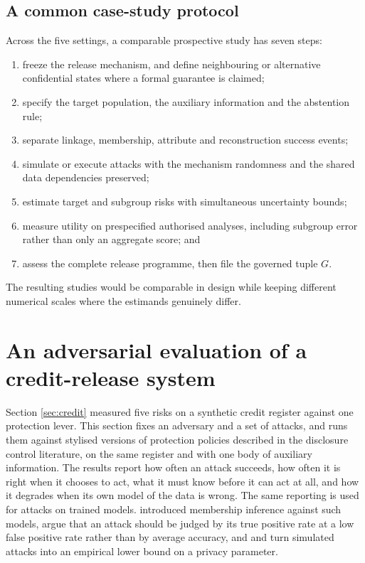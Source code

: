 \documentclass[11pt,a4paper]{article}
\theoremstyle{plain}
\theoremstyle{definition}
\begin{document}
\subsection{A common case-study protocol}

Across the five settings, a comparable prospective study has seven steps:

\begin{enumerate}
\item freeze the release mechanism, and define neighbouring or alternative
confidential states where a formal guarantee is claimed;
\item specify the target population, the auxiliary information and the abstention
rule;
\item separate linkage, membership, attribute and reconstruction success events;
\item simulate or execute attacks with the mechanism randomness and the shared
data dependencies preserved;
\item estimate target and subgroup risks with simultaneous uncertainty bounds;
\item measure utility on prespecified authorised analyses, including subgroup
error rather than only an aggregate score; and
\item assess the complete release programme, then file the governed tuple $G$.
\end{enumerate}

The resulting studies would be comparable in design while keeping different
numerical scales where the estimands genuinely differ.

\section{An adversarial evaluation of a credit-release system}\label{sec:eval}

Section \ref{sec:credit} measured five risks on a synthetic credit register
against one protection lever. This section fixes an adversary and a set of
attacks, and runs them against stylised versions of protection policies
described in the disclosure control literature, on the same register and with
one body of auxiliary information. The results report how often an attack
succeeds, how often it is right when it chooses to act, what it must know before
it can act at all, and how it degrades when its own model of the data is wrong.
The same reporting is used for attacks on trained models. \citet{shokri2017}
introduced membership inference against such models, \citet{carlini2022} argue
that an attack should be judged by its true positive rate at a low false positive
rate rather than by average accuracy, and \citet{jagielski2020} and
\citet{steinke2023} turn simulated attacks into an empirical lower bound on a
privacy parameter.
\end{document}
